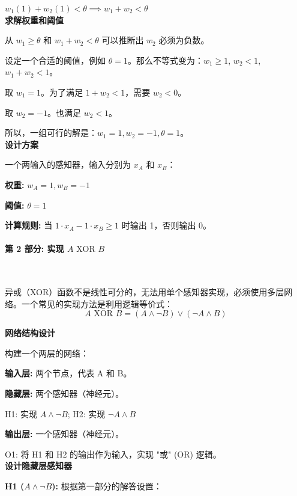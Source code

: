 \documentclass{article}
\begin{document}
    $w_1(1) + w_2(1) < \theta \implies w_1 + w_2 < \theta$\\

    \textbf{求解权重和阈值}
    
    从 $w_1 \ge \theta$ 和 $w_1 + w_2 < \theta$ 可以推断出 $w_2$ 必须为负数。
    
    设定一个合适的阈值，例如 $\theta = 1$。那么不等式变为：$w_1 \ge 1$, $w_2 < 1$, $w_1 + w_2 < 1$。
    
    取 $w_1=1$。为了满足 $1 + w_2 < 1$，需要 $w_2 < 0$。
    
    取 $w_2=-1$。也满足 $w_2 < 1$。
    
    所以，一组可行的解是：$w_1 = 1, w_2 = -1, \theta = 1$。\\

    \textbf{设计方案}
    
    一个两输入的感知器，输入分别为 $x_A$ 和 $x_B$：
    
    \textbf{权重:} $w_A = 1, w_B = -1$
    
    \textbf{阈值:} $\theta = 1$
    
    \textbf{计算规则:} 当 $1 \cdot x_A - 1 \cdot x_B \ge 1$ 时输出 1，否则输出 0。

    \paragraph{第 2 部分: 实现 $A \text{ XOR } B$}~{}
    
    异或（XOR）函数不是线性可分的，无法用单个感知器实现，必须使用多层网络。一个常见的实现方法是利用逻辑等价式：
    \[ A \text{ XOR } B = (A \land \neg B) \lor (\neg A \land B) \]
    
    \textbf{网络结构设计} 
    
    构建一个两层的网络：

    \textbf{输入层:} 两个节点，代表 A 和 B。
    
    \textbf{隐藏层:} 两个感知器（神经元）。
        
        H1: 实现 $A \land \neg B$;
        H2: 实现 $\neg A \land B$
    
    \textbf{输出层:} 一个感知器（神经元）。
    
        O1: 将 H1 和 H2 的输出作为输入，实现 "或" (OR) 逻辑。\\
        
    \textbf{设计隐藏层感知器}
    
    \textbf{H1 ($A \land \neg B$):} 根据第一部分的解答设置：
        
\end{document}
